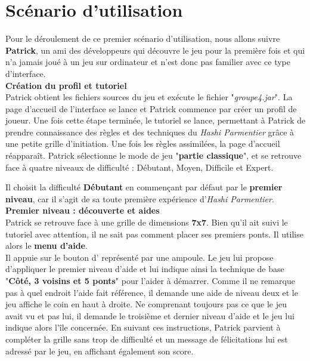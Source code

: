 \newpage
\wPt\vspace{-2.6cm}
\section{Scénario d’utilisation}
\begin{mdframed}
Pour le déroulement de ce premier scénario d'utilisation, nous allons suivre \textbf{Patrick}, un ami des développeurs qui découvre le jeu pour la première fois et qui n'a jamais joué à un jeu sur ordinateur et n'est donc pas familier avec ce type d'interface.\\

\textbf{Création du profil et tutoriel}  \\
Patrick obtient les fichiers sources du jeu et exécute le fichier "\textit{groupe4.jar}". La page d’accueil de l'interface se lance et Patrick commence par créer un profil de joueur. Une fois cette étape terminée, le tutoriel se lance, permettant à Patrick de prendre connaissance des règles et des techniques du \textit{Hashi Parmentier} grâce à une petite grille d’initiation. Une fois les règles assimilées, la page d'accueil réapparaît. Patrick sélectionne le mode de jeu "\textbf{partie classique}", et se retrouve face à quatre niveaux de difficulté : Débutant, Moyen, Difficile et Expert.
    
Il choisit la difficulté \textbf{Débutant} en commençant par défaut par le \textbf{premier niveau}, car il s’agit de sa toute première expérience d'\textit{Hashi Parmentier}.\\

\textbf{Premier niveau : découverte et aides}  \\
Patrick se retrouve face à une grille de dimensions \textbf{7x7}. Bien qu’il ait suivi le tutoriel avec attention, il ne sait pas comment placer ses premiers ponts. Il utilise alors le \textbf{menu d'aide}.\\

Il appuie sur le bouton d' représenté par une ampoule. Le jeu lui propose d’appliquer le premier niveau d'aide et lui indique ainsi la technique de base "\textbf{Côté, 3 voisins et 5 ponts}" pour l’aider à démarrer. Comme il ne remarque pas à quel endroit l'aide fait référence, il demande une aide de niveau deux et le jeu affiche le coin en haut à droite. Ne comprenant toujours pas ce que le jeu avait vu et pas lui, il demande le troisième et dernier niveau d'aide et le jeu lui indique alors l'île concernée. En suivant ces instructions, Patrick parvient à compléter la grille sans trop de difficulté et un message de félicitations lui est adressé par le jeu, en affichant également son score.\\


\end{mdframed}
